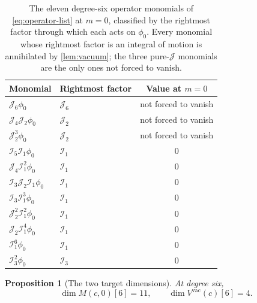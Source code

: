 \documentclass[11pt,reqno]{amsart}
\theoremstyle{plain}
\newtheorem{proposition}[theorem]{Proposition}
\theoremstyle{definition}
\theoremstyle{remark}
\numberwithin{equation}{section}
\newcommand{\Iop}{\mathcal I}
\newcommand{\Jop}{\mathcal J}
\begin{document}
\begin{table}[t]
\caption{The eleven degree-six operator monomials of
\eqref{eq:operator-list} at $m=0$, classified by the rightmost factor
through which each acts on $\phi_0$. Every monomial whose rightmost factor is
an integral of motion is annihilated by \cref{lem:vacuum}; the three
pure-$\Jop$ monomials are the only ones not forced to vanish.}
\label{tab:classification}
\begin{tabular}{llc}
\toprule
Monomial & Rightmost factor & Value at $m=0$ \\
\midrule
$\Jop_6\phi_0$                 & $\Jop_6$  & not forced to vanish \\
$\Jop_4\Jop_2\phi_0$           & $\Jop_2$  & not forced to vanish \\
$\Jop_2^3\phi_0$               & $\Jop_2$  & not forced to vanish \\
\midrule
$\Iop_5\Iop_1\phi_0$           & $\Iop_1$  & $0$ \\
$\Jop_4\Iop_1^2\phi_0$         & $\Iop_1$  & $0$ \\
$\Iop_3\Jop_2\Iop_1\phi_0$     & $\Iop_1$  & $0$ \\
$\Iop_3\Iop_1^3\phi_0$         & $\Iop_1$  & $0$ \\
$\Jop_2^2\Iop_1^2\phi_0$       & $\Iop_1$  & $0$ \\
$\Jop_2\Iop_1^4\phi_0$         & $\Iop_1$  & $0$ \\
$\Iop_1^6\phi_0$               & $\Iop_1$  & $0$ \\
$\Iop_3^2\phi_0$               & $\Iop_3$  & $0$ \\
\bottomrule
\end{tabular}
\end{table}

\begin{proposition}[The two target dimensions]
\label{prop:dimensions}
At degree six,
\begin{equation}
  \dim M(c,0)[6]=11,
  \qquad
  \dim V^{\mathrm{vac}}(c)[6]=4.
  \label{eq:dimensions}
\end{equation}
\end{proposition}
\end{document}
